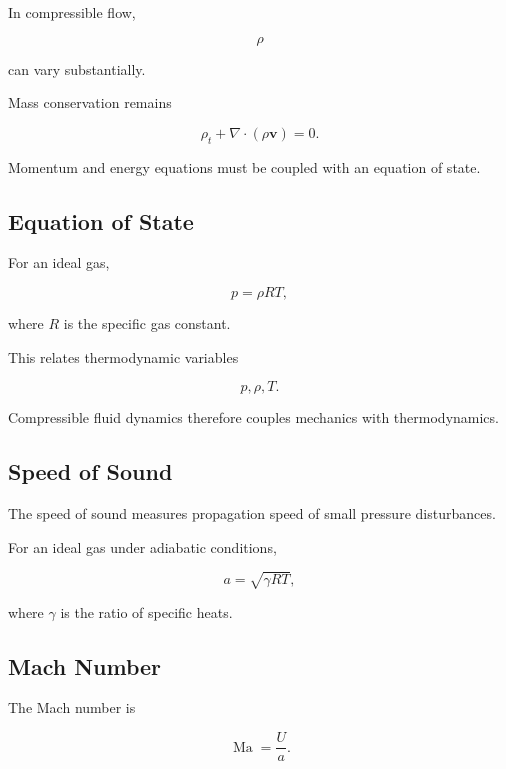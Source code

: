 In compressible flow,

\[
\boxed{
\rho
}
\]

can vary substantially.

Mass conservation remains

\[
\boxed{
\rho_t
+
\nabla\cdot(\rho\mathbf{v})
=
0.
}
\]

Momentum and energy equations must be coupled with an equation of state.

\subsection{Equation of State}
\label{subsec:fluid-equation-of-state}

For an ideal gas,

\[
\boxed{
p
=
\rho RT,
}
\]

where \(R\) is the specific gas constant.

This relates thermodynamic variables

\[
p,\rho,T.
\]

Compressible fluid dynamics therefore couples mechanics with thermodynamics.

\subsection{Speed of Sound}
\label{subsec:speed-of-sound}

The speed of sound measures propagation speed of small pressure disturbances.

For an ideal gas under adiabatic conditions,

\[
\boxed{
a
=
\sqrt{\gamma RT},
}
\]

where \(\gamma\) is the ratio of specific heats.

\subsection{Mach Number}
\label{subsec:mach-number}

The Mach number is

\[
\boxed{
\operatorname{Ma}
=
\frac{U}{a}.
}
\]


